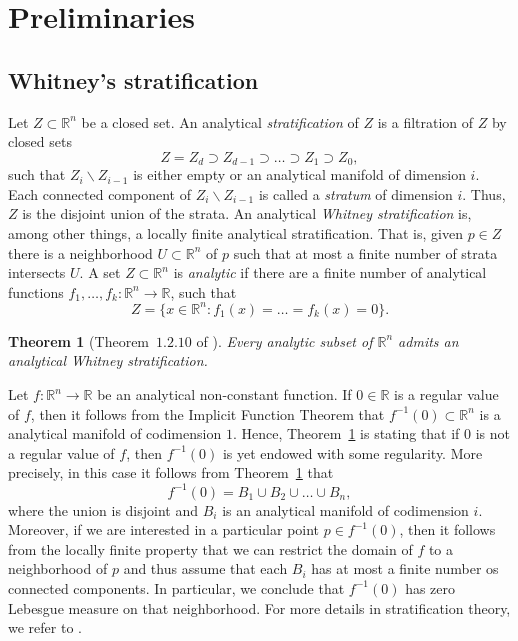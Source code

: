 \documentclass[11pt]{amsart}
\newtheorem{theorem}{Theorem}
\begin{document}
\section{Preliminaries}\label{Sec3}

\subsection{Whitney's stratification}\label{Sub3.1}

Let $Z\subset\mathbb{R}^n$ be a closed set. An analytical \emph{stratification} of $Z$ is a filtration of $Z$ by closed sets
\[Z=Z_d\supset Z_{d-1}\supset\dots\supset Z_1\supset Z_0,\]
such that $Z_i\backslash Z_{i-1}$ is either empty or an analytical manifold of dimension $i$. Each connected component of $Z_i\backslash Z_{i-1}$ is called a \emph{stratum} of dimension $i$. Thus, $Z$ is the disjoint union of the strata. An analytical \emph{Whitney stratification} is, among other things, a locally finite analytical stratification. That is, given $p\in Z$ there is a neighborhood $U\subset\mathbb{R}^n$ of $p$ such that at most a finite number of strata intersects $U$. A set $Z\subset\mathbb{R}^n$ is \emph{analytic} if there are a finite number of analytical functions $f_1,\dots,f_k\colon\mathbb{R}^n\to\mathbb{R}$, such that
\[Z=\{x\in\mathbb{R}^n\colon f_1(x)=\dots=f_k(x)=0\}.\]

\begin{theorem}[Theorem~$1.2.10$ of \cite{Trot}]\label{T5}
	Every analytic subset of $\mathbb{R}^n$ admits an analytical Whitney stratification.
\end{theorem}

Let $f\colon\mathbb{R}^n\to\mathbb{R}$ be an analytical non-constant function. If $0\in\mathbb{R}$ is a regular value of $f$, then it follows from the Implicit Function Theorem that $f^{-1}(0)\subset\mathbb{R}^n$ is a analytical manifold of codimension $1$. Hence, Theorem~\ref{T5} is stating that if $0$ is not a regular value of $f$, then $f^{-1}(0)$ is yet endowed with some regularity. More precisely, in this case it follows from Theorem~\ref{T5} that
\[f^{-1}(0)=B_1\cup B_2\cup\dots\cup B_n,\]
where the union is disjoint and $B_i$ is an analytical manifold of codimension $i$. Moreover, if we are interested in a particular point $p\in f^{-1}(0)$, then it follows from the locally finite property that we can restrict the domain of $f$ to a neighborhood of $p$ and thus assume that each $B_i$ has at most a finite number os connected components. In particular, we conclude that $f^{-1}(0)$ has zero Lebesgue measure on that neighborhood. For more details in stratification theory, we refer to \cite{Trot}.
\end{document}
